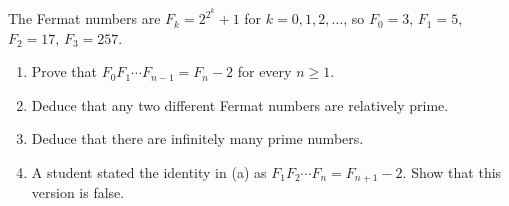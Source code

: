 The Fermat numbers are $F_k=2^{2^k}+1$ for $k=0,1,2,\dots$, so $F_0=3$, $F_1=5$, $F_2=17$, $F_3=257$.
\begin{enumerate}
\item[(a)] Prove that $F_0F_1\cdots F_{n-1}=F_n-2$ for every $n\ge1$.
\item[(b)] Deduce that any two different Fermat numbers are relatively prime.
\item[(c)] Deduce that there are infinitely many prime numbers.
\item[(d)] A student stated the identity in (a) as $F_1F_2\cdots F_n=F_{n+1}-2$. Show that this version is false.
\end{enumerate}
